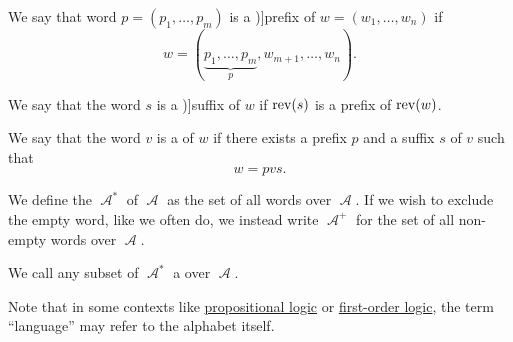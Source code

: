 \begin{definition}
\begin{thmenum}
    \mimprovised We say that word \( p = (p_1, \ldots, p_m) \) is a \term[ru=начало (\cite[20]{Гладкий1973Языки})]{prefix} of \( w = (w_1, \ldots, w_n) \) if
    \begin{equation*}
      w = (\underbrace{p_1, \ldots, p_m}_p, w_{m+1}, \ldots, w_n).
    \end{equation*}

    \mimprovised We say that the word \( s \) is a \term[ru=конец (\cite[20]{Гладкий1973Языки})]{suffix} of \( w \) if \( \operatorname{rev}(s) \) is a prefix of \( \operatorname{rev}(w) \).

     We say that the word \( v \) is a  of \( w \) if there exists a prefix \( p \) and a suffix \( s \) of \( v \) such that
    \begin{equation*}
      w = p v s.
    \end{equation*}

     We define the  \( \mscrA^* \) of \( \mscrA \) as the set of all words over \( \mscrA \). If we wish to exclude the empty word, like we often do, we instead write \( \mscrA^+ \) for the set of all non-empty words over \( \mscrA \).

     We call any subset of \( \mscrA^* \) a  over \( \mscrA \).
  \end{thmenum}
\end{definition}
\begin{comments}
  \item Note that in some contexts like \hyperref[subsec:propositional_logic]{propositional logic} or \hyperref[subsec:first_order_logic]{first-order logic}, the term \enquote{language} may refer to the alphabet itself.
\end{comments}

